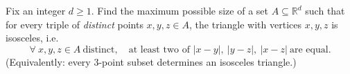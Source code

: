 Fix an integer $d\ge 1$.
Find the maximum possible size of a set $A\subseteq\mathbb R^d$ such that for every triple of \emph{distinct} points $x,y,z\in A$, the triangle with vertices $x,y,z$ is isosceles, i.e.
\[
\forall\ x,y,z\in A\ \text{distinct},\quad \text{at least two of }\lvert x-y\rvert,\ \lvert y-z\rvert,\ \lvert x-z\rvert\ \text{are equal}.
\]
(Equivalently: every 3-point subset determines an isosceles triangle.)
